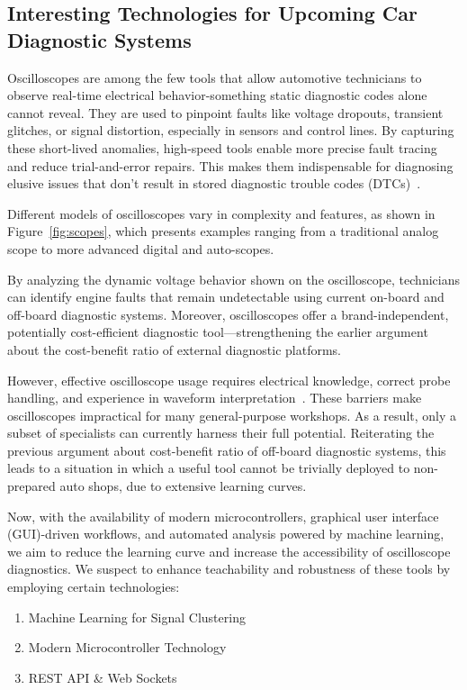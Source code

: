 \subsection{Interesting Technologies for Upcoming Car Diagnostic Systems}
Oscilloscopes are among the few tools that allow automotive technicians to observe real-time electrical behavior-something static diagnostic codes alone cannot reveal. 
They are used to pinpoint faults like voltage dropouts, transient glitches, or signal distortion, especially in sensors and control lines.
By capturing these short-lived anomalies, high-speed tools enable more precise fault tracing and reduce trial-and-error repairs. 
This makes them indispensable for diagnosing elusive issues that don’t result in stored diagnostic trouble codes (DTCs)~\cite{tektronix2024, fleetmaintenance2024, picoauto2023, fleetmaintenance2020}.

Different models of oscilloscopes vary in complexity and features, as shown in Figure~\ref{fig:scopes}, 
which presents examples ranging from a traditional analog scope to more advanced digital and auto-scopes.

By analyzing the dynamic voltage behavior shown on the oscilloscope, technicians can identify engine faults that remain undetectable using current on-board and off-board diagnostic systems.
Moreover, oscilloscopes offer a brand-independent, potentially cost-efficient diagnostic tool—strengthening the earlier argument about the cost-benefit ratio of external diagnostic platforms.

However, effective oscilloscope usage requires electrical knowledge, correct probe handling, and experience in waveform interpretation~\cite{rohde2024, autoditex2023, pico2021, mechanic2024}. 
These barriers make oscilloscopes impractical for many general-purpose workshops. 
As a result, only a subset of specialists can currently harness their full potential. 
Reiterating the previous argument about cost-benefit ratio of off-board diagnostic systems, 
this leads to a situation in which a useful tool cannot be trivially deployed to non-prepared auto shops, due to extensive learning curves.

Now, with the availability of modern microcontrollers, graphical user interface (GUI)-driven workflows, and automated analysis powered by machine learning, 
we aim to reduce the learning curve and increase the accessibility of oscilloscope diagnostics. 
We suspect to enhance teachability and robustness of these tools by employing certain technologies:
\begin{enumerate}[label=\alph*)]
  \item Machine Learning for Signal Clustering
  \item Modern Microcontroller Technology
  \item REST API \& Web Sockets
\end{enumerate}

